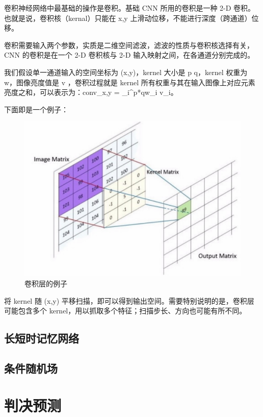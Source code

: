 卷积神经网络中最基础的操作是卷积。基础 CNN 所用的卷积是一种 2-D 卷积。也就是说，卷积核（kernal）只能在 x,y 上滑动位移，不能进行深度（跨通道）位移。

卷积需要输入两个参数，实质是二维空间滤波，滤波的性质与卷积核选择有关，CNN 的卷积是在一个 2-D 卷积核与 2-D 输入映射之间，在各通道分别完成的。

我们假设单一通道输入的空间坐标为 {\displaystyle (x,y)}，kernel 大小是 {\displaystyle p \times q}，kernel 权重为 {\displaystyle w}，图像亮度值是 {\displaystyle v} ，卷积过程就是 kernel 所有权重与其在输入图像上对应元素亮度之和，可以表示为：{\displaystyle conv_{x,y} = \sum_i^{p*q}w_i v_i}。

下面即是一个例子：

\begin{figure}[ht]
    \centering
    \includegraphics[width=600]{figures/cnn_conv}
    \caption{卷积层的例子}
    \label{fig:cnn_conv}
\end{figure}

将 kernel 随 {\displaystyle (x,y)} 平移扫描，即可以得到输出空间。需要特别说明的是，卷积层可能包含多个 kernel，用以抓取多个特征；扫描步长、方向也可能有所不同。

\subsection{长短时记忆网络}

\subsection{条件随机场}


\section{判决预测}
